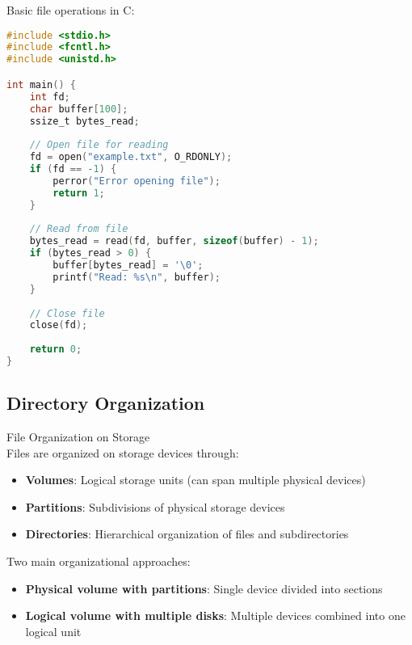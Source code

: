 \multend

\begin{example}
    Basic file operations in C:
    
\begin{lstlisting}[language=C, style=basesmol]
#include <stdio.h>
#include <fcntl.h>
#include <unistd.h>

int main() {
    int fd;
    char buffer[100];
    ssize_t bytes_read;
    
    // Open file for reading
    fd = open("example.txt", O_RDONLY);
    if (fd == -1) {
        perror("Error opening file");
        return 1;
    }
    
    // Read from file
    bytes_read = read(fd, buffer, sizeof(buffer) - 1);
    if (bytes_read > 0) {
        buffer[bytes_read] = '\0';
        printf("Read: %s\n", buffer);
    }
    
    // Close file
    close(fd);
    
    return 0;
}
\end{lstlisting}
\end{example}

\raggedcolumns
\columnbreak

\subsection{Directory Organization}

\begin{concept}{File Organization on Storage}\\
    Files are organized on storage devices through:
    \begin{itemize}
        \item \textbf{Volumes}: Logical storage units (can span multiple physical devices)
        \item \textbf{Partitions}: Subdivisions of physical storage devices
        \item \textbf{Directories}: Hierarchical organization of files and subdirectories
    \end{itemize}
    
    Two main organizational approaches:
    \begin{itemize}
        \item \textbf{Physical volume with partitions}: Single device divided into sections
        \item \textbf{Logical volume with multiple disks}: Multiple devices combined into one logical unit
    \end{itemize}
\end{concept}

